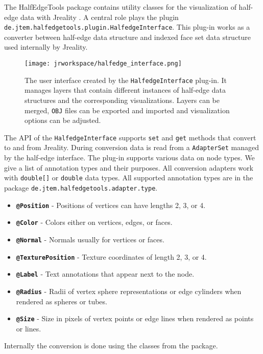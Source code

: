 The {\sc HalfEdgeTools} package contains utility classes for the visualization of half-edge data with 
{\sc Jreality} \cite{JrealityWebsite}. A central role plays the plugin {\tt de.jtem.halfedgetools.plugin.Halfedge\-Interface}. This plug-in works as a converter between half-edge data structure and indexed face set 
data structure used internally by {\sc Jreality}.

\begin{figure}[H]
	\centering
	\texttt{[image: jrworkspace/halfedge\_interface.png]}
	\caption{The user interface created by the {\tt HalfedgeInterface} plug-in. It manages layers that
		contain different instances of half-edge data structures and the corresponding visualizations.
		Layers can be merged, {\tt OBJ} files can be exported and imported and visualization
		options can be adjusted. 
	}
\end{figure}

The API of the {\tt HalfedgeInterface} supports {\tt set} and {\tt get} methods that convert to and from
{\sc Jreality}. During conversion data is read from a {\tt AdapterSet} managed by the half-edge
interface. The plug-in supports various data on node types. We give a list of annotation types and
their purposes. All conversion adapters work with {\tt double[]} or {\tt double} data types. All
supported annotation types are in the package {\tt de.jtem.halfedgetools.adapter.type}.

\begin{itemize}
\item {\tt\bf @Position} - Positions of vertices can have lengths 2, 3, or 4.
\item {\tt\bf @Color} - Colors either on vertices, edges, or faces.
\item {\tt\bf @Normal} - Normals usually for vertices or faces.
\item {\tt\bf @TexturePosition} - Texture coordinates of length 2, 3, or 4.
\item {\tt\bf @Label} - Text annotations that appear next to the node.
\item {\tt\bf @Radius} - Radii of vertex sphere representations or edge cylinders when rendered
as spheres or tubes.
\item {\tt\bf @Size} - Size in pixels of vertex points or edge lines when rendered as points or lines.
\end{itemize}

Internally the conversion is done using the classes from the package.


















